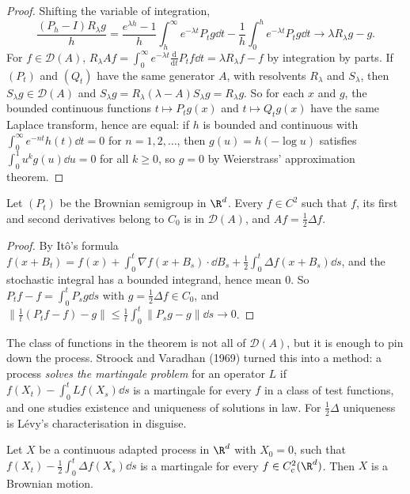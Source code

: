 \begin{proof}
Shifting the variable of integration,
\[
\frac{(P_h-I)R_\lambda g}h=\frac{e^{\lambda h}-1}h\int_h^\infty e^{-\lambda t}P_tg\dd t-\frac1h\int_0^he^{-\lambda t}P_tg\dd t\longrightarrow\lambda R_\lambda g-g .
\] For $f\in\mathcal D(A)$,
$R_\lambda Af=\int_0^\infty e^{-\lambda t}\frac{\mathrm d}{\mathrm dt}P_tf\dd t=\lambda R_\lambda f-f$ by integration by parts. If $(P_t)$ and $(Q_t)$ have the same generator $A$, with resolvents $R_\lambda$ and $S_\lambda$, then
$S_\lambda g\in\mathcal D(A)$ and $S_\lambda g=R_\lambda(\lambda-A)S_\lambda g=R_\lambda g$. So for each $x$ and $g$, the bounded continuous functions $t\mapsto P_tg(x)$ and $t\mapsto Q_tg(x)$ have the same Laplace transform, hence are
equal: if $h$ is bounded and continuous with $\int_0^\infty e^{-nt}h(t)\dd t=0$ for $n=1,2,\dots$, then $g(u)=h(-\log u)$ satisfies $\int_0^1u^kg(u)\dd u=0$ for all $k\ge0$, so $g=0$ by Weierstrass' approximation theorem.
\end{proof}

\begin{theorem}\label{thm:bmgenerator}
Let $(P_t)$ be the Brownian semigroup in $\R^d$. Every $f\in C^2$ such that $f$, its first and second derivatives belong to $C_0$ is in $\mathcal D(A)$, and $Af=\frac12\Delta f$.
\end{theorem}

\begin{proof}
By It\^o's formula $f(x+B_t)=f(x)+\int_0^t\nabla f(x+B_s)\cdot\dd B_s+\frac12\int_0^t\Delta f(x+B_s)\dd s$, and the stochastic integral has a bounded integrand, hence mean $0$. So $P_tf-f=\int_0^tP_sg\dd s$ with
$g=\frac12\Delta f\in C_0$, and $\|\frac1t(P_tf-f)-g\|\le\frac1t\int_0^t\|P_sg-g\|\dd s\to0$.
\end{proof}

The class of functions in the theorem is not all of $\mathcal D(A)$, but it is enough to pin down the process. Stroock and Varadhan (1969) turned this into a method: a process \emph{solves the martingale
problem} for an operator $L$ if $f(X_t)-\int_0^tLf(X_s)\dd s$ is a martingale for every $f$ in a class of test functions, and one studies existence and uniqueness of solutions in law. For $\frac12\Delta$ uniqueness is
L\'evy's characterisation in disguise.

\begin{theorem}\label{thm:martprob}
Let $X$ be a continuous adapted process in $\R^d$ with $X_0=0$, such that $f(X_t)-\frac12\int_0^t\Delta f(X_s)\dd s$ is a martingale for every $f\in C^2_c(\R^d)$. Then $X$ is a Brownian motion.
\end{theorem}

